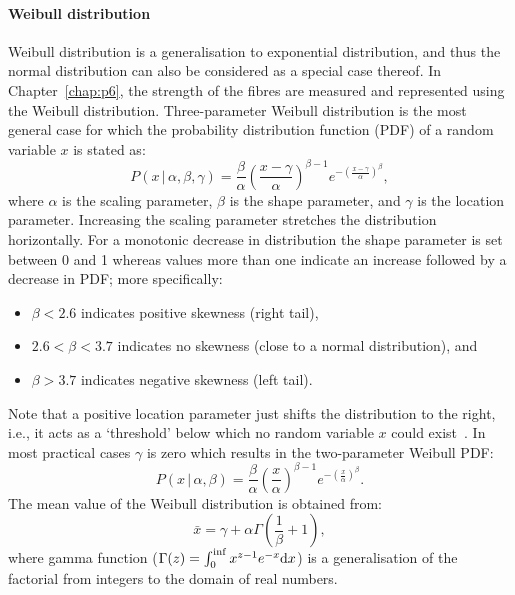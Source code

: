 	\paragraph{Weibull distribution} Weibull distribution is a generalisation to exponential distribution, and thus the normal distribution can also be considered as a special case thereof. In Chapter~\ref{chap:p6}, the strength of the fibres are measured and represented using the Weibull distribution. Three-parameter Weibull distribution is the most general case for which the probability distribution function (PDF) of a random variable $x$ is stated as:
    \begin{equation}
    	P(x\,|\,\alpha,\beta,\gamma)=\frac{\beta}{\alpha}\left(\frac{x-\gamma}{\alpha}\right)^{\beta-1}e^{-(\frac{x-\gamma}{\alpha})^\beta},
    \end{equation}
    where $\alpha$ is the scaling parameter, $\beta$ is the shape parameter, and $\gamma$ is the location parameter. Increasing the scaling parameter stretches the distribution horizontally. For a monotonic decrease in distribution the shape parameter is set between 0 and 1 whereas values more than one indicate an increase followed by a decrease in PDF; more specifically:
    \begin{itemize}
    \item $\beta<2.6$ indicates positive skewness (right tail),
    \item $2.6<\beta<3.7$ indicates no skewness (close to a normal distribution), and
    \item $\beta>3.7$ indicates negative skewness (left tail).
    \end{itemize}
    Note that a positive location parameter just shifts the distribution to the right, i.e., it acts as a `threshold' below which no random variable $x$ could exist~\autocite{Milton.2003}. In most practical cases $\gamma$ is zero which results in the two-parameter Weibull PDF:
    \begin{equation}
        P(x\,|\,\alpha,\beta)=\frac{\beta}{\alpha}\left(\frac{x}{\alpha}\right)^{\beta-1}e^{-\left(\frac{x}{\alpha}\right)^\beta}.
    \end{equation}    
    The mean value of the Weibull distribution is obtained from:
    \begin{equation}
    	\bar{x}=\gamma +\alpha \Gamma\left(\frac{1}{\beta}+1\right),
    \end{equation}
    where gamma function ($\Gamma(z)=\int_{0}^{\inf}x^{z-1}e^{-x}\text{d} x$) is a generalisation of the factorial from integers to the domain of real numbers.

